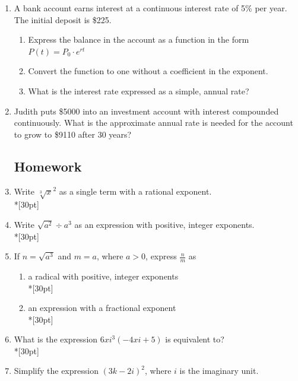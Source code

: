 \documentclass[12pt, oneside]{article}
\begin{document}
\begin{enumerate}
\item A bank account earns interest at a continuous interest rate of 5\% per year. The initial deposit is \$225.
\begin{enumerate}
    \item Express the balance in the account as a function in the form $P(t)=P_0 \cdot e^{rt}$\\[30pt]
    \item Convert the function to one without a coefficient in the exponent. \\[30pt]
    \item What is the interest rate expressed as a simple, annual rate?\\[30pt]
\end{enumerate}

\item Judith puts \$5000 into an investment account with interest compounded continuously. What is the approximate annual rate is needed for the account to grow to \$9110 after 30 years?

\newpage

\subsection*{Homework}

\item Write $\sqrt[3]x^2$ as a single term with a rational exponent.\\*[30pt]

\item Write $\sqrt{a^2} \div a^3$ as an expression with positive, integer exponents.\\*[30pt]

\item If $n=\sqrt{a^3}$ and $m=a$, where $a > 0$, express $\frac{n}{m}$ as 
\begin{enumerate}
    \item a radical with positive, integer exponents\\*[30pt]
    \item an expression with a fractional exponent\\*[30pt]
\end{enumerate}
\item What is the expression $6xi^3(-4xi+5)$ is equivalent to?\\*[30pt]  %

\item Simplify the expression $(3k - 2i)^2$, where $i$ is the imaginary unit.\\[30pt] %


\end{enumerate}
\end{document}
